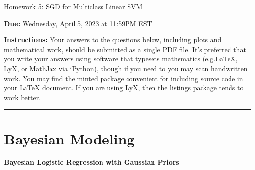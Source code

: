 \documentclass{article}
\newcommand{\nyuparagraph}[1]{\vspace{0.3cm}\textcolor{nyupurple}{\bf \large #1}\\}
\newcommand{\ruleskip}{\bigskip\hrule\bigskip}
\theoremstyle{plain}
\theoremstyle{definition}
\begin{document}

\pagestyle{myheadings} 

\begin{center}
{\Large
Homework 5: SGD for Multiclass Linear SVM
} 
\end{center}

{
{ \color{nyupurple} \textbf{Due:} Wednesday, April 5, 2023 at 11:59PM EST} 
} 

\textbf{Instructions: }Your answers to the questions below, including plots and mathematical
 work, should be submitted as a single PDF file.  It's preferred that you write your answers using software that typesets mathematics (e.g.LaTeX, LyX, or MathJax via iPython), though if you need to you may scan handwritten work.  You may find the \href{https://github.com/gpoore/minted}{minted} package convenient for including source code in your LaTeX document.  If you are using LyX, then the \href{https://en.wikibooks.org/wiki/LaTeX/Source_Code_Listings}{listings} package tends to work better.

\ruleskip

\section{Bayesian Modeling}
\nyuparagraph{Bayesian Logistic Regression with Gaussian Priors}
\end{document}
